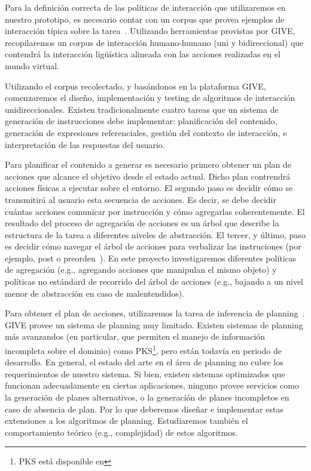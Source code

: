 Para la definici\'on correcta de las pol\'iticas de interacci\'on que
utilizaremos en nuestro prototipo, es necesario 
contar con un corpus que provea ejemplos de interacci\'on t\'ipica sobre la 
tarea~\citep{HCRC-93, byron-06}.  Utilizando herramientas provistas por GIVE, 
recopilaremos un corpus de interacci\'on humano-humano (uni y bidireccional)
que contendr\'a la interacci\'on lig\"u\'istica alineada con las acciones
realizadas en el mundo virtual. 

Utilizando el corpus recolectado, y bas\'andonos en la plataforma GIVE, 
comenzaremos el dise\~no,
implementaci\'on y testing de algoritmos de interacci\'on unidireccionales. 
Existen tradicionalmente cuatro tareas que un sistema de generaci\'on
de instrucciones debe implementar: planificaci\'on del contenido, generaci\'on
de expresiones referenciales, gesti\'on del contexto de interacci\'on, e
interpretaci\'on de las respuestas del usuario. 

Para planificar el contenido a generar es necesario primero obtener un plan de
acciones que alcance el objetivo desde el estado actual. Dicho plan contrendr\'a
acciones f\'isicas a ejecutar sobre el entorno. El segundo paso es decidir 
c\'omo se transmitir\'a al usuario esta secuencia de acciones. Es decir, 
se debe decidir cu\'antas acciones comunicar
por instrucci\'on y c\'omo agregarlas coherentemente. El
resultado del proceso de agregaci\'on de acciones es un \'arbol que describe la
estructura de la tarea a diferentes niveles de abstracci\'on. El tercer, y \'ultimo, paso
es decidir c\'omo navegar el \'arbol de acciones para verbalizar las
instruciones (por ejemplo, post o preorden~\citep{foster-etal-ijcai2009}). En este proyecto investigaremos
diferentes pol\'iticas de agregaci\'on (e.g., agregando acciones que manipulan el mismo
objeto) y pol\'iticas no est\'andard de recorrido del \'arbol de acciones (e.g., bajando a un
nivel menor de abstracci\'on en caso de malentendidos).  

Para obtener el plan de acciones, utilizaremos la tarea de inferencia de
planning~\citep{nau04}. GIVE provee un sistema de planning muy
limitado.  Existen sistemas de planning m\'as avanzandos (en particular,
que permiten el manejo de informaci\'on incompleta sobre el dominio)
como PKS\footnote{PKS est\'a disponible en }, pero
est\'an todav\'ia en periodo de desarrollo.  En general, el estado del
arte en el \'area de planning no cubre los requerimientos de nuestro
sistema.  Si bien, existen sistemas optimizados que funcionan adecuadamente
en ciertas aplicaciones, ninguno provee servicios como la generaci\'on de
planes alternativos, o la generaci\'on de planes incompletos en caso de
absencia de plan. Por lo que deberemos dise\~nar e implementar estas
extensiones a los algoritmos de planning. Estudiaremos tambi\'en el
comportamiento te\'orico (e.g., complejidad) de estos algoritmos. 

